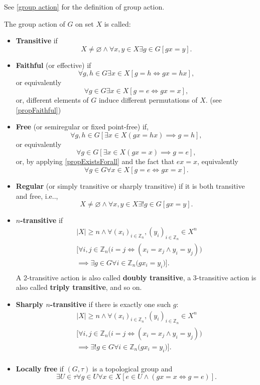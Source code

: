 \documentclass[12pt, letterpaper]{article}
\makeatletter
\newcommand{\inte}{\mathbb{Z}}
\newcommand\ie{i.e\@ifnextchar.{}{.\@}}
\newcommand{\card}[1]{\left\lvert #1 \right\rvert}
\renewcommand{\emptyset}{\varnothing}
\theoremstyle{definition}
\theoremstyle{remark}
\theoremstyle{definition}
\theoremstyle{plain}
\numberwithin{equation}{section}
\makeatother
\begin{document}
	See \ref{group action} for the definition of group action.
	\begin{def*}
		The group action of $G$ on set $X$ is called:
		\begin{itemize}
			\item \textbf{Transitive} if 
			\[ X\ne \emptyset \land \forall x,y\in X\exists g\in G[gx=y]. \]
			\item \textbf{Faithful} (or effective) if
			\[ \forall g,h\in G\exists x\in X[g= h\iff gx= hx], \]
			or equivalently
			\[ \forall g\in G\exists x\in X[g=e\iff gx= x],  \]
			or, different elements of $G$ induce different permutations of $X$. (see \ref{propFaithful})
			\item \textbf{Free} (or semiregular or fixed point-free) if, 
			\[ \forall g,h\in G [ \exists x \in X(gx=hx)\implies g=h ], \]
			or equivalently
			\[ \forall g\in G[\exists x\in X (gx=x)\implies g=e ] ,\]
			or, by applying \ref{propExistsForall} and the fact that $ex=x$,
			equivalently
			\[ \forall g\in G\forall x\in X[ g=e\iff  gx=x ] .\]
			
			\item \textbf{Regular} (or simply transitive or sharply transitive) if it is both transitive and free, \ie,
			\[ X\ne \emptyset\land \forall x,y\in X \exists! g\in G[gx=y]. \]
			\item \textbf{$n$-transitive} if
			\[ \begin{aligned}
				&\card{X}\ge n \land \forall (x_i)_{i\in\inte_n},(y_i)_{i\in\inte_n} \in X^n\\
				&\Big[ \forall i,j \in \inte_n\big(i=j\iff (x_i= x_j\land y_i=y_j) \big)\\
				&\implies \exists g\in G\forall i\in\inte_n\big(gx_i=y_i\big) \Big].\\
			\end{aligned}
			\]
			A 2-transitive action is also called \textbf{doubly transitive},
			a 3-transitive action is also called \textbf{triply transitive}, and so on.
			\item \textbf{Sharply $n$-transitive} if there is exactly one such $g$:
			\[ \begin{aligned}
				&\card{X}\ge n \land \forall (x_i)_{i\in\inte_n},(y_i)_{i\in\inte_n} \in X^n\\
				&\Big[ \forall i,j \in \inte_n\big(i=j\iff (x_i= x_j\land y_i=y_j) \big)\\
				&\implies \exists! g\in G\forall i\in\inte_n\big(gx_i=y_i\big) \Big].\\
			\end{aligned}
			\]
			\item \textbf{Locally free} if $(G,\tau)$ is a topological group and
			\[ \exists U\in\tau \forall g\in U\forall x\in X [ e\in U \land (gx=x\iff g=e) ] .\]
		\end{itemize}
	\end{def*}
\end{document}
